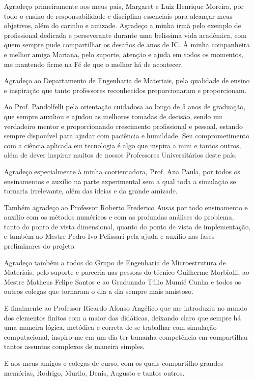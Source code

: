 \documentclass[
	12pt,				%
	openright,			%
	twoside,			%
	a4paper,			%
	chapter=TITLE,		%
	english,			%
	french,				%
	spanish,			%
	brazil,				%
	hyphens,
  oldfontcommands]{abntex2}
\theoremstyle{definition}
\theoremstyle{definition}
\begin{document}
\begin{agradecimentos}

Agradeço primeiramente aos meus pais, Margaret e Luiz Henrique Moreira, por todo o ensino de
responsabilidade e disciplina essenciais para alcançar meus objetivos, além do
carinho e amizade. Agradeço a minha irmã pelo exemplo de profissional dedicada e
perseverante durante uma belíssima vida acadêmica, com quem sempre pude
compartilhar os desafios de anos de IC. À minha companheira e melhor amiga
Mariana, pelo suporte, atenção e ajuda em todos os momentos, me mantendo firme
na Fé de que o melhor há de acontecer.

Agradeço ao Departamento de Engenharia de Materiais, pela qualidade de ensino e
inspiração que tanto professores reconhecidos proporcionaram e proporcionam.

Ao Prof. Pandolfelli pela orientação cuidadosa ao longo de 5 anos de graduação, que sempre
auxiliou e ajudou as melhores tomadas de decisão, sendo um verdadeiro mentor e proporcionando
crescimento profissional e pessoal, estando sempre disponível para ajudar com
paciência e humildade. Seu comprometimento com a ciência aplicada em tecnologia
é algo que inspira a mim e tantos outros, além de dever inspirar muitos de
nossos Professores Universitários deste país.

Agradeço especialmente à minha coorientadora, Prof. Ana Paula, por todos os
ensinamentos e auxílio na parte experimental sem a qual toda a simulação se
tornaria irrelevante, além das ideias e da grande amizade.

Também agradeço ao Professor Roberto Frederico Ausas por todo ensinamento e
auxílio com os métodos numéricos e com as profundas análises do problema, tanto
do ponto de vista dimensional, quanto do ponto de vista de implementação, e
também ao Mestre Pedro Ivo Pelissari pela ajuda e auxílio nas fases preliminares
do projeto.

Agradeço também a todos do Grupo de Engenharia de Microestrutura de Materiais,
pelo suporte e parceria nas pessoas do técnico Guilherme Morbiolli, ao Mestre
Matheus Felipe Santos e ao Graduando Túlio Mumi\'c Cunha e todos os outros
colegas que tornaram o dia a dia sempre mais amistoso.

E finalmente ao Professor Ricardo Afonso Angélico que me introduziu no mundo dos elementos
finitos com a maior das didáticas, deixando claro que sempre há uma maneira
lógica, metódica e correta de se trabalhar com simulação computacional,
inspiro-me em um dia ter tamanha competência em compartilhar tantos assuntos
complexos de maneira simples.

E aos meus amigos e colegas de curso, com os quais compartilho grandes memórias,
Rodrigo, Murilo, Denis, Augusto e tantos outros. 

\end{agradecimentos}
\end{document}
